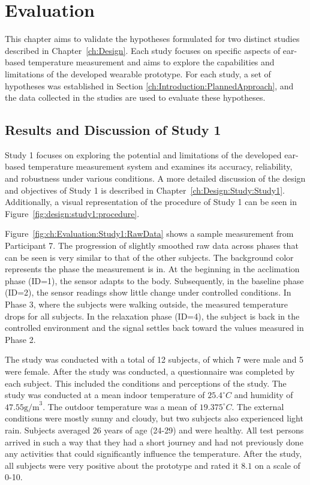 \chapter{Evaluation}
\label{ch:Evaluation}
This chapter aims to validate the hypotheses formulated for two distinct studies described in Chapter~\ref{ch:Design}. 
Each study focuses on specific aspects of ear-based temperature measurement and aims to explore the capabilities and limitations of the developed wearable prototype. 
For each study, a set of hypotheses was established in Section \ref{ch:Introduction:PlannedApproach}, and the data collected in the studies are used to evaluate these hypotheses.

\section{Results and Discussion of Study 1}
\label{sec:Evaluation:Study1}
Study 1 focuses on exploring the potential and limitations of the developed ear-based temperature measurement system and examines its accuracy, reliability, and robustness under various conditions. 
A more detailed discussion of the design and objectives of Study 1 is described in Chapter~\ref{ch:Design:Study:Study1}.
Additionally, a visual representation of the procedure of Study 1 can be seen in Figure~\ref{fig:design:study1:procedure}.

Figure~\ref{fig:ch:Evaluation:Study1:RawData} shows a sample measurement from Participant 7.
The progression of slightly smoothed raw data across phases that can be seen is very similar to that of the other subjects. 
The background color represents the phase the measurement is in.
At the beginning in the acclimation phase (ID=1), the sensor adapts to the body. 
Subsequently, in the baseline phase (ID=2), the sensor readings show little change under controlled conditions.
In Phase 3, where the subjects were walking outside, the measured temperature drops for all subjects.
In the relaxation phase (ID=4), the subject is back in the controlled environment and the signal settles back toward the values measured in Phase 2.

The study was conducted with a total of 12 subjects, of which 7 were male and 5 were female. 
After the study was conducted, a questionnaire was completed by each subject. 
This included the conditions and perceptions of the study. 
The study was conducted at a mean indoor temperature of $25.4 ^\circ C$ and humidity of $47.55 \text{g/m}^3$. 
The outdoor temperature was a mean of $19.375 ^\circ C$.
The external conditions were mostly sunny and cloudy, but two subjects also experienced light rain.
Subjects averaged 26 years of age (24-29) and were healthy.
All test persons arrived in such a way that they had a short journey and had not previously done any activities that could significantly influence the temperature.
After the study, all subjects were very positive about the prototype and rated it $8.1$ on a scale of 0-10.

